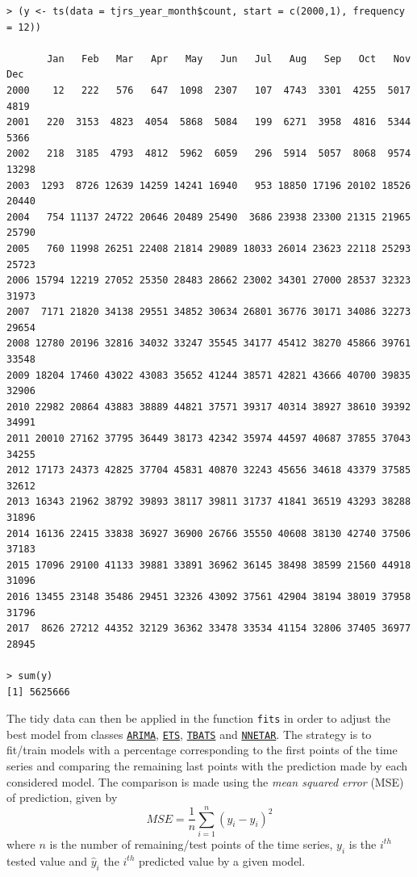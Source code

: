 \documentclass[a4paper]{exam}
\theoremstyle{plain}
\begin{document}
\begin{tcolorbox}[colback=black, coltext=white]
\begingroup
\fontsize{9pt}{9pt}\selectfont
\begin{verbatim}
> (y <- ts(data = tjrs_year_month$count, start = c(2000,1), frequency = 12))

       Jan   Feb   Mar   Apr   May   Jun   Jul   Aug   Sep   Oct   Nov   Dec
2000    12   222   576   647  1098  2307   107  4743  3301  4255  5017  4819
2001   220  3153  4823  4054  5868  5084   199  6271  3958  4816  5344  5366
2002   218  3185  4793  4812  5962  6059   296  5914  5057  8068  9574 13298
2003  1293  8726 12639 14259 14241 16940   953 18850 17196 20102 18526 20440
2004   754 11137 24722 20646 20489 25490  3686 23938 23300 21315 21965 25790
2005   760 11998 26251 22408 21814 29089 18033 26014 23623 22118 25293 25723
2006 15794 12219 27052 25350 28483 28662 23002 34301 27000 28537 32323 31973
2007  7171 21820 34138 29551 34852 30634 26801 36776 30171 34086 32273 29654
2008 12780 20196 32816 34032 33247 35545 34177 45412 38270 45866 39761 33548
2009 18204 17460 43022 43083 35652 41244 38571 42821 43666 40700 39835 32906
2010 22982 20864 43883 38889 44821 37571 39317 40314 38927 38610 39392 34991
2011 20010 27162 37795 36449 38173 42342 35974 44597 40687 37855 37043 34255
2012 17173 24373 42825 37704 45831 40870 32243 45656 34618 43379 37585 32612
2013 16343 21962 38792 39893 38117 39811 31737 41841 36519 43293 38288 31896
2014 16136 22415 33838 36927 36900 26766 35550 40608 38130 42740 37506 37183
2015 17096 29100 41133 39881 33891 36962 36145 38498 38599 21560 44918 31096
2016 13455 23148 35486 29451 32326 43092 37561 42904 38194 38019 37958 31796
2017  8626 27212 44352 32129 36362 33478 33534 41154 32806 37405 36977 28945

> sum(y)
[1] 5625666
\end{verbatim}
\endgroup
\end{tcolorbox}

The tidy data can then be applied in the function \texttt{fits} in order to adjust the best model from classes \href{https://otexts.com/fpp2/arima.html}{\nolinkurl{ARIMA}}, \href{https://otexts.com/fpp2/ets.html}{\nolinkurl{ETS}}, \href{https://otexts.com/fpp2/complexseasonality.html}{\nolinkurl{TBATS}} and \href{https://otexts.com/fpp2/nnetar.html}{\nolinkurl{NNETAR}}. The strategy is to fit/train models with a percentage corresponding to the first points of the time series and comparing the remaining last points with the prediction made by each considered model. The comparison is made using the \textit{mean squared error} (MSE) of prediction, given by \[ MSE = \frac{1}{n} \sum_{i=1}^n (y_i - \hat{y}_i)^2\] where $n$ is the number of remaining/test points of the time series, $y_i$ is the $i^{th}$ tested value and $\hat{y}_i$ the $i^{th}$ predicted value by a given model. 
\end{document}
